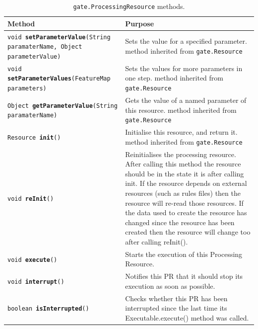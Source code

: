 \begin{table}[htbp]
\begin{small}
\begin{center}
\begin{tabular}{|p{}|p{}|}
\hline
\textbf{Method} & \textbf{Purpose}\\
\hline
{\tt void {\bf setParameterValue}(String paramaterName, Object
parameterValue)} & Sets the value for a specified parameter. {\small method
inherited from {\tt gate.Resource}}\\
\hline
{\tt void {\bf setParameterValues}(FeatureMap parameters)} & Sets the
values for more parameters in one step. {\small method inherited from {\tt
gate.Resource}}\\
\hline
{\tt Object {\bf getParameterValue}(String paramaterName)} & Gets the value
of a named parameter of this resource. {\small method inherited from {\tt
gate.Resource}}\\
\hline
{\tt Resource {\bf init}()} & Initialise this resource, and return it.
{\small method inherited from {\tt gate.Resource}}\\
\hline
{\tt void {\bf reInit}()} & Reinitialises the processing resource. After
calling this method the resource should be in the state it is after calling
init. If the resource depends on external resources (such as rules files)
then the resource will re-read those resources. If the data used to create
the resource has changed since the resource has been created then the
resource will change too after calling reInit().\\
\hline
{\tt void {\bf execute}()} & Starts the execution of this Processing
Resource.\\
\hline
{\tt void {\bf interrupt}()} & Notifies this PR that it should stop its
execution as soon as possible.\\
\hline
{\tt boolean {\bf isInterrupted}()} & Checks whether this PR has been
interrupted since the last time its Executable.execute() method was
called.\\
\hline
\end{tabular}
\caption{{\tt gate.ProcessingResource} methods.}
\label{table:pr}
\end{center}
\end{small}
\end{table}


